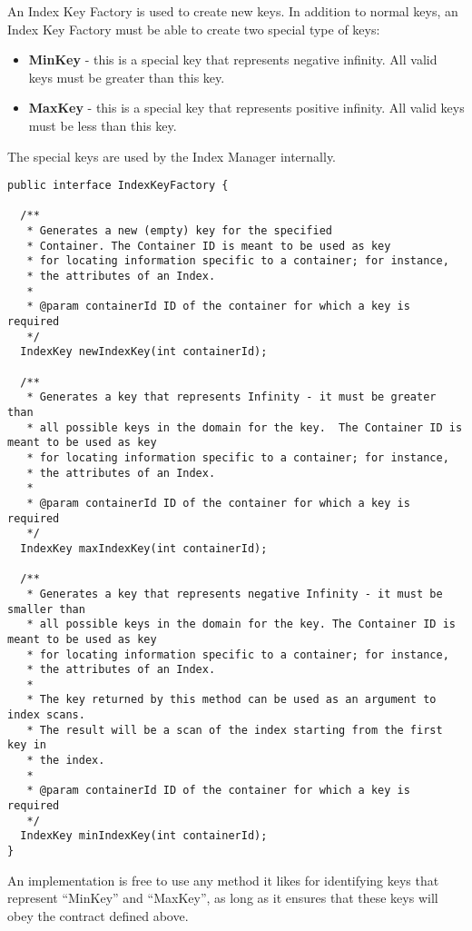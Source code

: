 \documentclass[a4paper,draft,oneside]{book}
\begin{document}
An Index Key Factory is used to create new keys. In addition to normal keys, an Index
Key Factory must be able to create two special type of keys:

\begin{itemize}
	\item \textbf{MinKey} - this is a special key that represents negative infinity. All valid keys must be greater than this key.
	\item \textbf{MaxKey} - this is a special key that represents positive infinity. All valid keys must be less than this key.
\end{itemize}

The special keys are used by the Index Manager internally.

\begin{verbatim}
public interface IndexKeyFactory {

  /**
   * Generates a new (empty) key for the specified
   * Container. The Container ID is meant to be used as key
   * for locating information specific to a container; for instance,
   * the attributes of an Index.
   * 
   * @param containerId ID of the container for which a key is required
   */
  IndexKey newIndexKey(int containerId);

  /**
   * Generates a key that represents Infinity - it must be greater than
   * all possible keys in the domain for the key.  The Container ID is meant to be used as key
   * for locating information specific to a container; for instance,
   * the attributes of an Index.
   * 
   * @param containerId ID of the container for which a key is required
   */
  IndexKey maxIndexKey(int containerId);
	
  /**
   * Generates a key that represents negative Infinity - it must be smaller than
   * all possible keys in the domain for the key. The Container ID is meant to be used as key
   * for locating information specific to a container; for instance,
   * the attributes of an Index.
   *
   * The key returned by this method can be used as an argument to index scans.
   * The result will be a scan of the index starting from the first key in 
   * the index.
   * 
   * @param containerId ID of the container for which a key is required
   */
  IndexKey minIndexKey(int containerId);
}
\end{verbatim}

An implementation is free to use any method it likes for 
identifying keys that represent ``MinKey'' and ``MaxKey'', as long as it ensures
that these keys will obey the contract defined above.
\end{document}
